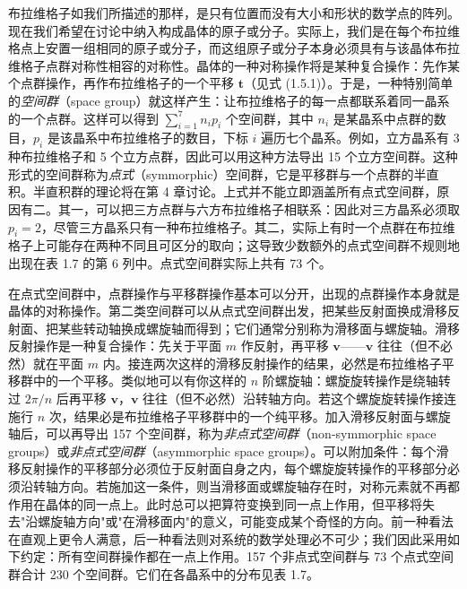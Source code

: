 布拉维格子如我们所描述的那样，是只有位置而没有大小和形状的数学点的阵列。现在我们希望在讨论中纳入构成晶体的原子或分子。实际上，我们是在每个布拉维格点上安置一组相同的原子或分子，而这组原子或分子本身必须具有与该晶体布拉维格子点群对称性相容的对称性。晶体的一种对称操作将是某种复合操作：先作某个点群操作，再作布拉维格子的一个平移 $\mathbf{t}$（见式 (1.5.1)）。于是，一种特别简单的\textit{空间群}（space group）就这样产生：让布拉维格子的每一点都联系着同一晶系的一个点群。这样可以得到 $\sum_{i=1}^{7} n_{i}p_{i}$ 个空间群，其中 $n_{i}$ 是某晶系中点群的数目，$p_{i}$ 是该晶系中布拉维格子的数目，下标 $i$ 遍历七个晶系。例如，立方晶系有 3 种布拉维格子和 5 个立方点群，因此可以用这种方法导出 15 个立方空间群。这种形式的空间群称为\textit{点式}（symmorphic）空间群，它是平移群与一个点群的半直积。半直积群的理论将在第 4 章讨论。上式并不能立即涵盖所有点式空间群，原因有二。其一，可以把三方点群与六方布拉维格子相联系：因此对三方晶系必须取 $p_{i} = 2$，尽管三方晶系只有一种布拉维格子。其二，实际上有时一个点群在布拉维格子上可能存在两种不同且可区分的取向；这导致少数额外的点式空间群不规则地出现在表 1.7 的第 6 列中。点式空间群实际上共有 73 个。

在点式空间群中，点群操作与平移群操作基本可以分开，出现的点群操作本身就是晶体的对称操作。第二类空间群可以从点式空间群出发，把某些反射面换成滑移反射面、把某些转动轴换成螺旋轴而得到；它们通常分别称为滑移面与螺旋轴。滑移反射操作是一种复合操作：先关于平面 $m$ 作反射，再平移 $\mathbf{v}$——$\mathbf{v}$ 往往（但不必然）就在平面 $m$ 内。接连两次这样的滑移反射操作的结果，必然是布拉维格子平移群中的一个平移。类似地可以有你这样的 $n$ 阶螺旋轴：螺旋旋转操作是绕轴转过 $2\pi/n$ 后再平移 $\mathbf{v}$，$\mathbf{v}$ 往往（但不必然）沿转轴方向。若这个螺旋旋转操作接连施行 $n$ 次，结果必是布拉维格子平移群中的一个纯平移。加入滑移反射面与螺旋轴后，可以再导出 157 个空间群，称为\textit{非点式空间群}（non-symmorphic space groups）或\textit{非点式空间群}（asymmorphic space groups）。可以附加条件：每个滑移反射操作的平移部分必须位于反射面自身之内，每个螺旋旋转操作的平移部分必须沿转轴方向。若施加这一条件，则当滑移面或螺旋轴存在时，对称元素就不再都作用在晶体的同一点上。此时总可以把算符变换到同一点上作用，但平移将失去"沿螺旋轴方向"或"在滑移面内"的意义，可能变成某个奇怪的方向。前一种看法在直观上更令人满意，后一种看法则对系统的数学处理必不可少；我们因此采用如下约定：所有空间群操作都在一点上作用。157 个非点式空间群与 73 个点式空间群合计 230 个空间群。它们在各晶系中的分布见表 1.7。


